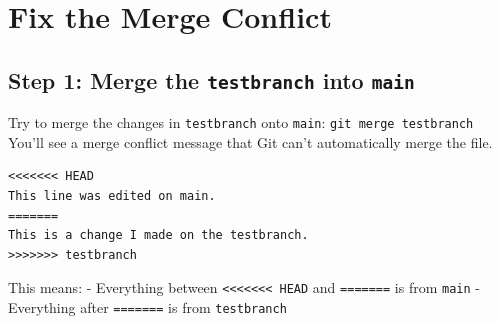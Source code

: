 \documentclass[
  11pt,
  letterpaper,
  DIV=11,
  numbers=noendperiod]{scrartcl}
\let\textttOrig\texttt
\renewcommand{\texttt}[1]{\textttOrig{\colorbox{codebggray}{\textcolor{codefontcolor}{#1}}}}
\begin{document}
\section{Fix the Merge Conflict}\label{fix-the-merge-conflict}

\subsection{\texorpdfstring{Step 1: Merge the \texttt{testbranch} into
\texttt{main}}{Step 1: Merge the testbranch into main}}\label{step-1-merge-the-testbranch-into-main}

Try to merge the changes in \texttt{testbranch} onto \texttt{main}:
\texttt{git\ merge\ testbranch} You'll see a merge conflict message that
Git can't automatically merge the file.

\begin{verbatim}
<<<<<<< HEAD
This line was edited on main.
=======
This is a change I made on the testbranch.
>>>>>>> testbranch
\end{verbatim}

This means: - Everything between
\texttt{\textless{}\textless{}\textless{}\textless{}\textless{}\textless{}\textless{}\ HEAD}
and \texttt{=======} is from \texttt{main} - Everything after
\texttt{=======} is from \texttt{testbranch}
\end{document}
